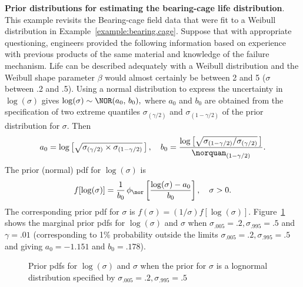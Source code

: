 \begin{example}
\label{example:bearing.cage.prior}
{\bf Prior distributions for estimating the bearing-cage life
distribution}.  This example revisits the Bearing-cage field data
that were fit to a Weibull distribution in
Example~\ref{example:bearing.cage}.  Suppose that with appropriate
questioning, engineers provided the following information based on
experience with previous products of the same material and knowledge
of the failure mechanism.  Life can be described adequately with a
Weibull distribution and the Weibull shape parameter $\beta$ would
almost certainly be between 2 and 5 ($\sigma$ between .2 and .5).
Using a normal distribution to express the uncertainty in
$\log(\sigma)$ gives $\log(\sigma) \sim
\NOR(a_{0},\, b_{0}), $ where $a_{0}$ and $b_{0}$ are obtained from
the specification of two extreme quantiles $\sigma_{(\gamma/2)}$ and
$\sigma_{(1-\gamma/2)}$ of the prior distribution for $\sigma$. Then
\begin{displaymath}
a_{0}= \log \left  [\sqrt{\sigma_{(\gamma/2)}\times\sigma_{(1-\gamma/2)}}
           \, \right ],
\quad
b_{0}= \frac
     {\log \left
	[\sqrt{\sigma_{(1-\gamma/2)}/\sigma_{(\gamma/2)}}\,\right ]}
	{\norquan_{(1-\gamma/2)}}.
\end{displaymath}
The prior (normal) pdf for $\log(\sigma)$ is
\begin{displaymath}
f[\log(\sigma)]= \frac{1}{b_{0}} \, 
  \phi_{\nor} \left [
	 \frac{\log(\sigma)-a_{0}}
	      {b_{0}}
              \right ], \quad \sigma>0.
\end{displaymath}
The corresponding prior pdf for $\sigma$ is $f(\sigma)=(1/\sigma)
f[\log(\sigma)]$.  Figure~\ref{figure:sigma.prior2.ps} shows the
marginal prior pdfs for $\log(\sigma)$ and $\sigma$ when $\sigma_{.005}=.2,
\sigma_{.995}=.5$ and $\gamma=.01$ (corresponding to 1\% probability outside
the limits $\sigma_{.005}=.2, \sigma_{.995}=.5$ and giving
$a_{0}=-1.151$ and $b_{0}=.178$).
\begin{figure}
\caption{Prior pdfs for $\log(\sigma)$ and $\sigma$ when
the prior for $\sigma$ is 
a lognormal distribution specified by $\sigma_{.005}=.2, \sigma_{.995}=.5$}
\label{figure:sigma.prior2.ps}
\end{figure}


\end{example}
